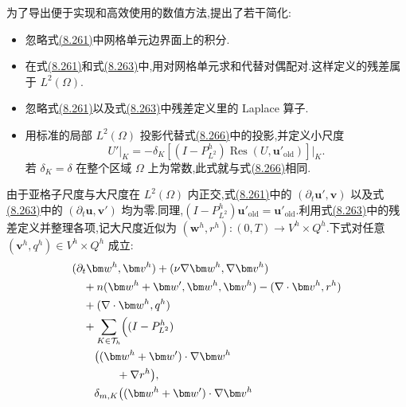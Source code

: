 \begin{note}
\label{note:vms-oss-method}
为了导出便于实现和高效使用的数值方法,\textcite{Codina2002}提出了若干简化:
\begin{itemize}
 \item 忽略式\hyperref[eq:vms-oss-large-scale-integration-by-parts]{(8.261)}中网格单元边界面上的积分.
 \item 在式\hyperref[eq:vms-oss-large-scale-integration-by-parts]{(8.261)}和式\hyperref[eq:vms-oss-time-dependent-residual-equation]{(8.263)}中,用对网格单元求和代替对偶配对.这样定义的残差属于 $L^2(\Omega)$.
 \item 忽略式\hyperref[eq:vms-oss-large-scale-integration-by-parts]{(8.261)}以及式\hyperref[eq:vms-oss-time-dependent-residual-equation]{(8.263)}中残差定义里的 Laplace 算子.
 \item 用标准的局部 $L^2(\Omega)$ 投影代替式\hyperref[eq:vms-oss-projected-subscale-model]{(8.266)}中的投影,并定义小尺度
 \[
 U'\big|_K=-\delta_K\left[(I-P^h_{L^2})\operatorname{Res}(U,\bm u'_{\mathrm{old}})\right]\big|_K.
 \]
 若 $\delta_K=\delta$ 在整个区域 $\Omega$ 上为常数,此式就与式\hyperref[eq:vms-oss-projected-subscale-model]{(8.266)}相同.
\end{itemize}
由于亚格子尺度与大尺度在 $L^2(\Omega)$ 内正交,式\hyperref[eq:vms-oss-large-scale-integration-by-parts]{(8.261)}中的 $(\partial_t\bm u',\bm v)$ 以及式\hyperref[eq:vms-oss-time-dependent-residual-equation]{(8.263)}中的 $(\partial_t\bm u,\bm v')$ 均为零.同理,$(I-P^h_{L^2})\bm u'_{\mathrm{old}}=\bm u'_{\mathrm{old}}$.利用式\hyperref[eq:vms-oss-time-dependent-residual-equation]{(8.263)}中的残差定义并整理各项,记大尺度近似为 $(\bm w^h,r^h):(0,T)\to V^h\times Q^h$.下式对任意 $(\bm v^h,q^h)\in V^h\times Q^h$ 成立:
\begin{equation}\label{eq:vms-oss-resolved-scale-method}
\begin{aligned}
 &(\partial_t\bm w^h,\bm v^h)
   +(\nu\nabla\bm w^h,\nabla\bm v^h)\\
 &\quad+n(\bm w^h+\bm w',\bm w^h,\bm v^h)
   -(\nabla\cdot\bm v^h,r^h)\\
 &\quad+(\nabla\cdot\bm w^h,q^h)\\
 &\quad+\sum_{K\in\mathcal T_h}\Bigl(
    (I-P^h_{L^2})\\
 &\qquad\bigl((\bm w^h+\bm w')\cdot\nabla\bm w^h\\
 &\qquad\qquad+\nabla r^h\bigr),\\
 &\qquad\delta_{m,K}\bigl((\bm w^h+\bm w')\cdot\nabla\bm v^h\\

\end{aligned}
\end{equation}
\end{note}
